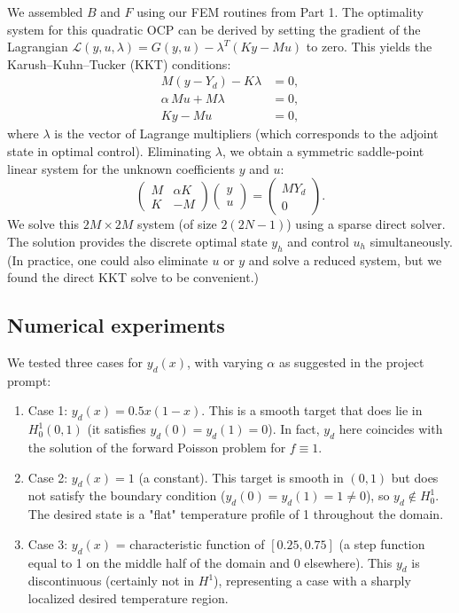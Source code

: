 \documentclass[a4paper,10pt]{article}
\begin{document}
We assembled $B$ and $F$ using our FEM routines from Part 1. The optimality system for this quadratic OCP can be derived by setting the gradient of the Lagrangian $\mathcal{L}(y,u,\lambda) = G(y,u) - \lambda^T(Ky - Mu)$ to zero. This yields the Karush–Kuhn–Tucker (KKT) conditions:
\begin{align*}
	M(y-Y_d) - K\lambda   & = 0, \\
	\alpha\,Mu + M\lambda & = 0, \\
	Ky-Mu                 & = 0,
\end{align*}
where $\lambda$ is the vector of Lagrange multipliers (which corresponds to the adjoint state in optimal control). Eliminating $\lambda$, we obtain a symmetric saddle-point linear system for the unknown coefficients $y$ and $u$:
\[
	\begin{pmatrix}
		M & \alpha K \\
		K & -M
	\end{pmatrix}
	\begin{pmatrix}
		y \\
		u
	\end{pmatrix}
	=
	\begin{pmatrix}
		MY_d \\
		0
	\end{pmatrix}.
\]
We solve this $2M \times 2M$ system (of size $2(2N-1)$) using a sparse direct solver. The solution provides the discrete optimal state $y_h$ and control $u_h$ simultaneously. (In practice, one could also eliminate $u$ or $y$ and solve a reduced system, but we found the direct KKT solve to be convenient.)

\subsection{Numerical experiments} We tested three cases for $y_d(x)$, with varying $\alpha$ as suggested in the project prompt:

\begin{enumerate}
	\item Case 1: $y_d(x) = 0.5x(1-x)$. This is a smooth target that does lie in $H^1_0(0,1)$ (it satisfies $y_d(0)=y_d(1)=0$). In fact, $y_d$ here coincides with the solution of the forward Poisson problem for $f\equiv 1$.
	\item Case 2: $y_d(x) = 1$ (a constant). This target is smooth in $(0,1)$ but does not satisfy the boundary condition ($y_d(0)=y_d(1)=1\neq0$), so $y_d\notin H^1_0$. The desired state is a "flat" temperature profile of 1 throughout the domain.
	\item Case 3: $y_d(x)$ = characteristic function of $[0.25,0.75]$ (a step function equal to 1 on the middle half of the domain and 0 elsewhere). This $y_d$ is discontinuous (certainly not in $H^1$), representing a case with a sharply localized desired temperature region.
\end{enumerate}
\end{document}

